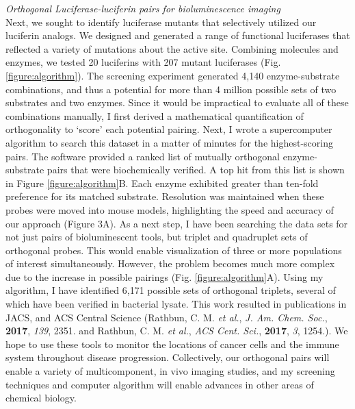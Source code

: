 \documentclass[11pt]{article}
\begin{document}
\textit{Orthogonal Luciferase-luciferin pairs for bioluminescence imaging}\\
Next, we sought to identify luciferase mutants that selectively utilized our luciferin analogs. We designed and generated a range of functional luciferases that reflected a variety of mutations about the active site. Combining molecules and enzymes, we tested 20 luciferins with 207 mutant luciferases (Fig. \ref{figure:algorithm}). The screening experiment generated 4,140 enzyme-substrate combinations, and thus a potential for more than 4 million possible sets of two substrates and two enzymes. Since it would be impractical to evaluate all of these combinations manually, I first derived a mathematical quantification of orthogonality to ‘score’ each potential pairing. Next, I wrote a supercomputer algorithm to search this dataset in a matter of minutes for the highest-scoring pairs. The software provided a ranked list of mutually orthogonal enzyme-substrate pairs that were biochemically verified. A top hit from this list is shown in Figure \ref{figure:algorithm}B. Each enzyme exhibited greater than ten-fold preference for its matched substrate. Resolution was maintained when these probes were moved into mouse models, highlighting the speed and accuracy of our approach (Figure 3A). As a next step, I have been searching the data sets for not just pairs of bioluminescent tools, but triplet and quadruplet sets of orthogonal probes. This would enable visualization of three or more populations of interest simultaneously. However, the problem becomes much more complex due to the increase in possible pairings (Fig. \ref{figure:algorithm}A). Using my algorithm, I have identified 6,171 possible sets of orthogonal triplets, several of which have been verified in bacterial lysate. This work resulted in publications in JACS, and ACS Central Science (Rathbun, C. M. \textit{et al.}, \textit{J. Am. Chem. Soc.}, \textbf{2017}, \textit{139}, 2351. and Rathbun, C. M. \textit{et al.}, \textit{ACS Cent. Sci.}, \textbf{2017}, \textit{3}, 1254.). We hope to use these tools to monitor the locations of cancer cells and the immune system throughout disease progression. Collectively, our orthogonal pairs will enable a variety of multicomponent, in vivo imaging studies, and my screening techniques and computer algorithm will enable advances in other areas of chemical biology.
\end{document}
